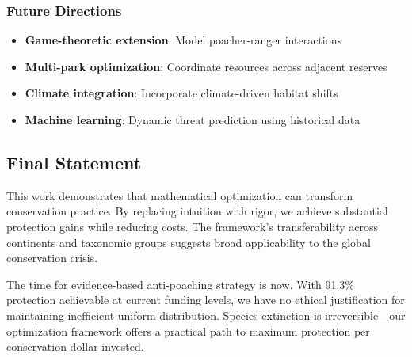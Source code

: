 \subsubsection{Future Directions}
\begin{itemize}
    \item \textbf{Game-theoretic extension}: Model poacher-ranger interactions
    \item \textbf{Multi-park optimization}: Coordinate resources across adjacent reserves
    \item \textbf{Climate integration}: Incorporate climate-driven habitat shifts
    \item \textbf{Machine learning}: Dynamic threat prediction using historical data
\end{itemize}

\subsection{Final Statement}

This work demonstrates that mathematical optimization can transform conservation practice. By replacing intuition with rigor, we achieve substantial protection gains while reducing costs. The framework's transferability across continents and taxonomic groups suggests broad applicability to the global conservation crisis.

The time for evidence-based anti-poaching strategy is now. With 91.3\% protection achievable at current funding levels, we have no ethical justification for maintaining inefficient uniform distribution. Species extinction is irreversible—our optimization framework offers a practical path to maximum protection per conservation dollar invested.
